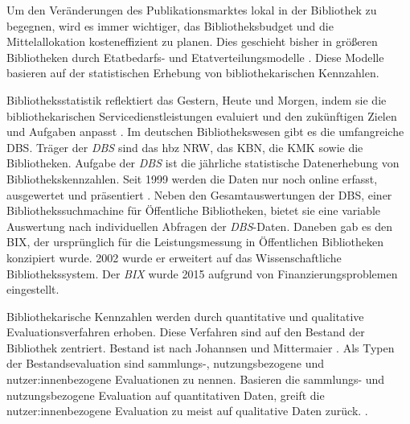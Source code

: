 Um den Veränderungen des Publikationsmarktes lokal in der Bibliothek zu begegnen, wird es immer wichtiger, das Bibliotheksbudget und die Mittelallokation kosteneffizient zu planen. 
Dies geschieht bisher in größeren Bibliotheken durch Etatbedarfs- und Etatverteilungsmodelle \cite[Vgl.][172 ff.]{moravetz-kuhlmann_monika_erwerbungspolitik_2015}.
Diese Modelle basieren auf der statistischen Erhebung von bibliothekarischen Kennzahlen.

Bibliotheksstatistik reflektiert das Gestern, Heute und Morgen, indem 
sie die bibliothekarischen Servicedienstleistungen evaluiert und den zukünftigen Zielen und Aufgaben anpasst \cites[Vgl.][2 f.]{jilovsky_cathie_library_2004}[Vgl.][462]{laitinen_markku_library_2013}.
Im deutschen Bibliothekswesen gibt es die umfangreiche \acrfull{DBS}. 
Träger der \textit{\acrshort{DBS}} sind das \acrfull{hbz NRW},  das \acrfull{KBN}, die \acrfull{KMK} sowie die Bibliotheken.
Aufgabe der \textit{\acrshort{DBS}} ist die jährliche statistische Datenerhebung von Bibliothekskennzahlen. 
Seit 1999 werden die Daten nur noch online erfasst, ausgewertet und präsentiert \cite[Vgl.][2]{schmidt_deutsche_2008}.
Neben den Gesamtauswertungen der DBS, einer Bibliothekssuchmachine für Öffentliche Bibliotheken, 
bietet sie eine variable Auswertung nach individuellen Abfragen der \textit{\acrshort{DBS}}-Daten. 
Daneben gab es den \acrfull{BIX}, der ursprünglich für die Leistungsmessung in Öffentlichen Bibliotheken konzipiert wurde. 
2002 wurde er erweitert auf das Wissenschaftliche Bibliothekssystem. Der \textit{\acrshort{BIX}} wurde 2015 aufgrund von Finanzierungsproblemen eingestellt. 

Bibliothekarische Kennzahlen werden durch quantitative und qualitative Evaluationsverfahren erhoben. Diese Verfahren
sind auf den Bestand der Bibliothek zentriert. 
Bestand ist nach Johannsen und Mittermaier
 \cite[252]{johannsen_jochen_bestands-_2015}.
Als Typen der Bestandsevaluation sind sammlungs-, nutzungsbezogene und nutzer:innenbezogene Evaluationen zu nennen.\cite[Vgl.][302]{johnson_peggy_fundamentals_2014}
Basieren die sammlungs- und nutzungsbezogene Evaluation auf quantitativen Daten, greift die nutzer:innenbezogene Evaluation zu meist auf qualitative Daten zurück. 
\cite[Vgl.][461 ff.]{blake_data_2004}.


